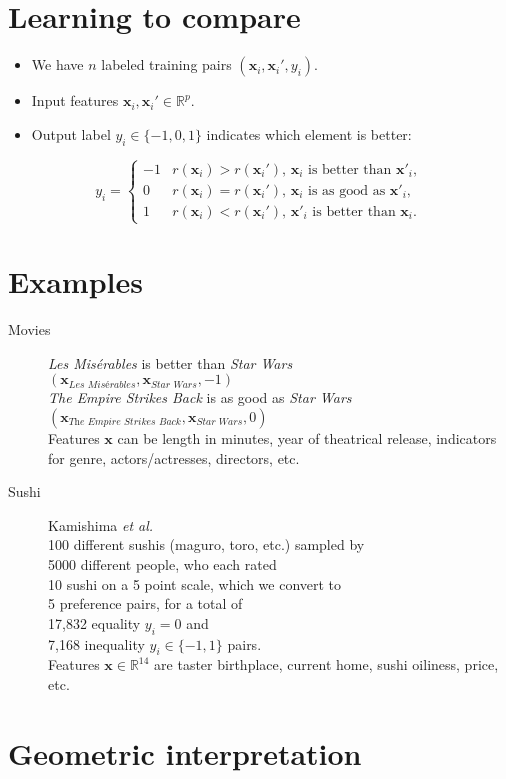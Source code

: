 \documentclass{article}
\newcommand{\RR}{\mathbb R}
\begin{document}
\begin{minipage}{3.5in}

\section*{Learning to compare}
\begin{itemize}
\item We have $n$ labeled training pairs $(\mathbf x_i, \mathbf x_i', y_i)$.
\item Input features $\mathbf x_i,\mathbf x_i'\in\RR^p$.
\item Output label $y_i\in\{-1,0,1\}$ indicates which element is better:
\end{itemize}
\begin{equation*}
  \label{eq:z}
  y_i =
  \begin{cases}
    -1 &  r(\mathbf x_i)>r(\mathbf x_i')
    \text{, $\mathbf x_i$ is better than $\mathbf x'_i$},\\
    0 & r(\mathbf x_i) = r(\mathbf x_i')
    \text{, $\mathbf x_i$ is as good as $\mathbf x'_i$},\\
    1 & r(\mathbf x_i)<r(\mathbf x_i')
    \text{, $\mathbf x'_i$ is better than $\mathbf x_i$}.
  \end{cases}
\end{equation*}

\section*{Examples}

\begin{description}
\item[Movies]
  \textit{Les Mis\'erables} is better than \textit{Star Wars}\\
  $(\mathbf x_{\textit{Les Mis\'erables}}, \mathbf x_{\textit{Star Wars}}, -1)$\\
  \textit{The Empire Strikes Back} is as good as \textit{Star Wars}\\
  $(\mathbf x_{\textit{The Empire Strikes Back}}, \mathbf x_{\textit{Star Wars}}, 0)$\\
  Features $\mathbf x$ can be length in minutes, year of theatrical
  release, indicators for genre, actors/actresses, directors, etc.
\item[Sushi] Kamishima \emph{et al.}\\
  100 different sushis (maguro, toro, etc.) sampled by\\
  5000 different people, who each rated\\
  10 sushi on a 5 point scale, which we convert to\\
  5 preference pairs, for a total of\\
  17,832 equality $y_i=0$ and \\
  7,168 inequality $y_i\in\{-1,1\}$ pairs.\\
  Features $\mathbf x\in\RR^{14}$ are taster birthplace, current home,
  sushi oiliness, price, etc.
\end{description}

\section*{Geometric interpretation}



  
\end{minipage}
\end{document}
